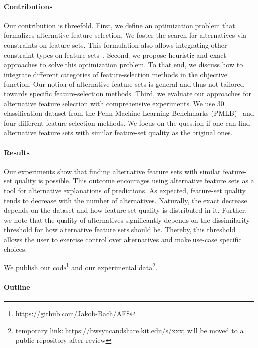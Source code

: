 \documentclass{article}
\theoremstyle{definition}
\begin{document}
\paragraph{Contributions}

Our contribution is threefold.
First, we define an optimization problem that formalizes alternative feature selection.
We foster the search for alternatives via constraints on feature sets.
This formulation also allows integrating other constraint types on feature sets~\cite{paclik2002feature,yuan2006model,groves2015toward}.
Second, we propose heuristic and exact approaches to solve this optimization problem.
To that end, we discuss how to integrate different categories of feature-selection methods in the objective function.
Our notion of alternative feature sets is general and thus not tailored towards specific feature-selection methods.
Third, we evaluate our approaches for alternative feature selection with comprehensive experiments.
We use 30 classification dataset from the Penn Machine Learning Benchmarks (PMLB)~\cite{olson2017pmlb, romano2021pmlb} and four different feature-selection methods.
We focus on the question if one can find alternative feature sets with similar feature-set quality as the original ones.

\paragraph{Results}

Our experiments show that finding alternative feature sets with similar feature-set quality is possible.
This outcome encourages using alternative feature sets as a tool for alternative explanations of predictions.
As expected, feature-set quality tends to decrease with the number of alternatives.
Naturally, the exact decrease depends on the dataset and how feature-set quality is distributed in it.
Further, we note that the quality of alternatives significantly depends on the dissimilarity threshold for how alternative feature sets should be.
Thereby, this threshold allows the user to exercise control over alternatives and make use-case specific choices.

We publish our code\footnote{\url{https://github.com/Jakob-Bach/AFS}} and our experimental data\footnote{temporary link: \url{https://bwsyncandshare.kit.edu/s/xxx}; will be moved to a public repository after review}.

\paragraph{Outline}
\end{document}
